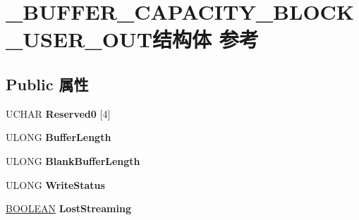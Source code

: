 \hypertarget{struct___b_u_f_f_e_r___c_a_p_a_c_i_t_y___b_l_o_c_k___u_s_e_r___o_u_t}{}\section{\+\_\+\+B\+U\+F\+F\+E\+R\+\_\+\+C\+A\+P\+A\+C\+I\+T\+Y\+\_\+\+B\+L\+O\+C\+K\+\_\+\+U\+S\+E\+R\+\_\+\+O\+U\+T结构体 参考}
\label{struct___b_u_f_f_e_r___c_a_p_a_c_i_t_y___b_l_o_c_k___u_s_e_r___o_u_t}
\subsection*{Public 属性}
\begin{DoxyCompactItemize}
\item 
\mbox{\label{struct___b_u_f_f_e_r___c_a_p_a_c_i_t_y___b_l_o_c_k___u_s_e_r___o_u_t_aab37802edfeca65939bb8e99b7d436d8}} 
U\+C\+H\+AR {\bfseries Reserved0} \mbox{[}4\mbox{]}
\item 
\mbox{\label{struct___b_u_f_f_e_r___c_a_p_a_c_i_t_y___b_l_o_c_k___u_s_e_r___o_u_t_a95f6da4e46311e22ef6e3d6b388084b7}} 
U\+L\+O\+NG {\bfseries Buffer\+Length}
\item 
\mbox{\label{struct___b_u_f_f_e_r___c_a_p_a_c_i_t_y___b_l_o_c_k___u_s_e_r___o_u_t_a9d6a24ee5d3e19bae116614e084b1a6c}} 
U\+L\+O\+NG {\bfseries Blank\+Buffer\+Length}
\item 
\mbox{\label{struct___b_u_f_f_e_r___c_a_p_a_c_i_t_y___b_l_o_c_k___u_s_e_r___o_u_t_a5380da20782b9cc409af2e9b6b5cfa3c}} 
U\+L\+O\+NG {\bfseries Write\+Status}
\item 
\mbox{\label{struct___b_u_f_f_e_r___c_a_p_a_c_i_t_y___b_l_o_c_k___u_s_e_r___o_u_t_aea4d1b51a837e999901a3019d7a6ad74}} 
\hyperlink{_processor_bind_8h_a112e3146cb38b6ee95e64d85842e380a}{B\+O\+O\+L\+E\+AN} {\bfseries Lost\+Streaming}

\end{DoxyCompactItemize}
